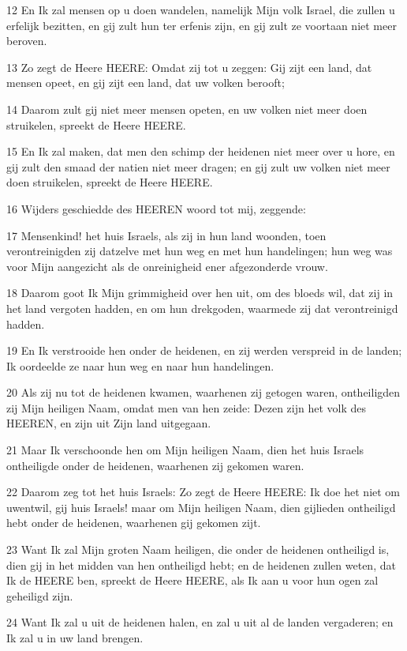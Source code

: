 \par 12 En Ik zal mensen op u doen wandelen, namelijk Mijn volk Israel, die zullen u erfelijk bezitten, en gij zult hun ter erfenis zijn, en gij zult ze voortaan niet meer beroven.
\par 13 Zo zegt de Heere HEERE: Omdat zij tot u zeggen: Gij zijt een land, dat mensen opeet, en gij zijt een land, dat uw volken berooft;
\par 14 Daarom zult gij niet meer mensen opeten, en uw volken niet meer doen struikelen, spreekt de Heere HEERE.
\par 15 En Ik zal maken, dat men den schimp der heidenen niet meer over u hore, en gij zult den smaad der natien niet meer dragen; en gij zult uw volken niet meer doen struikelen, spreekt de Heere HEERE.
\par 16 Wijders geschiedde des HEEREN woord tot mij, zeggende:
\par 17 Mensenkind! het huis Israels, als zij in hun land woonden, toen verontreinigden zij datzelve met hun weg en met hun handelingen; hun weg was voor Mijn aangezicht als de onreinigheid ener afgezonderde vrouw.
\par 18 Daarom goot Ik Mijn grimmigheid over hen uit, om des bloeds wil, dat zij in het land vergoten hadden, en om hun drekgoden, waarmede zij dat verontreinigd hadden.
\par 19 En Ik verstrooide hen onder de heidenen, en zij werden verspreid in de landen; Ik oordeelde ze naar hun weg en naar hun handelingen.
\par 20 Als zij nu tot de heidenen kwamen, waarhenen zij getogen waren, ontheiligden zij Mijn heiligen Naam, omdat men van hen zeide: Dezen zijn het volk des HEEREN, en zijn uit Zijn land uitgegaan.
\par 21 Maar Ik verschoonde hen om Mijn heiligen Naam, dien het huis Israels ontheiligde onder de heidenen, waarhenen zij gekomen waren.
\par 22 Daarom zeg tot het huis Israels: Zo zegt de Heere HEERE: Ik doe het niet om uwentwil, gij huis Israels! maar om Mijn heiligen Naam, dien gijlieden ontheiligd hebt onder de heidenen, waarhenen gij gekomen zijt.
\par 23 Want Ik zal Mijn groten Naam heiligen, die onder de heidenen ontheiligd is, dien gij in het midden van hen ontheiligd hebt; en de heidenen zullen weten, dat Ik de HEERE ben, spreekt de Heere HEERE, als Ik aan u voor hun ogen zal geheiligd zijn.
\par 24 Want Ik zal u uit de heidenen halen, en zal u uit al de landen vergaderen; en Ik zal u in uw land brengen.

